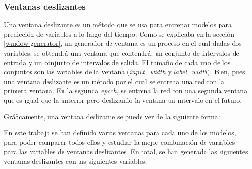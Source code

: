 \subsubsection{Ventanas deslizantes} \label{sliding-windows}

Una ventana deslizante es un método que se usa para entrenar modelos para predicción de variables a lo largo del tiempo. Como se explicaba en la sección \ref{window-generator}, un generador de ventana es un proceso en el cual dadas dos variables, se obtendrá una ventana que contendrá: un conjunto de intervalos de entrada y un conjunto de intervalos de salida. El tamaño de cada uno de los conjuntos son las variables de la ventana (\textit{input_width} y \textit{label_width}). Bien, pues una ventana deslizante es un método por el cual se entrena una red con la primera ventana. En la segunda \textit{epoch}, se entrena la red con una segunda ventana que es igual que la anterior pero deslizando la ventana un intervalo en el futuro.
\newline

Gráficamente, una ventana deslizante se puede ver de la siguiente forma:



En este trabajo se han definido varias ventanas para cada uno de los modelos, para poder comparar todos ellos y estudiar la mejor combinación de variables para las variables de ventanas deslizantes. En total, se han generado las siguientes ventanas deslizantes con las siguientes variables:

